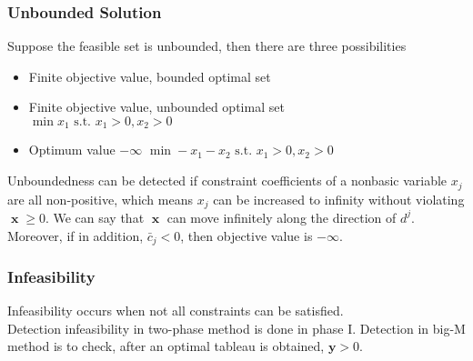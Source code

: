 \documentclass[12pt]{article}
\theoremstyle{definition}
\DeclareMathOperator{\x}{\mathbf{x}}
\begin{document}
\subsubsection{Unbounded Solution}
Suppose the feasible set is unbounded, then there are three possibilities
\begin{itemize}
  \item Finite objective value, bounded optimal set
  \item Finite objective value, unbounded optimal set\\
  $\min x_1 \text{ s.t. }x_1>0, x_2>0$
  \item Optimum value $-\infty$
  $\min -x_1-x_2\text{ s.t. }x_1>0, x_2>0$
\end{itemize}
Unboundedness can be detected if constraint coefficients of a nonbasic variable $x_j$ are all non-positive, which means $x_j$ can be increased to infinity without violating $\x\geq 0$. We can say that $\x$ can move infinitely along the direction of $d^j$.\\
Moreover, if in addition, $\bar{c}_j<0$, then objective value is $-\infty$.
\subsubsection{Infeasibility}
Infeasibility occurs when not all constraints can be satisfied.\\
Detection infeasibility in two-phase method is done in phase I. Detection in big-M method is to check, after an optimal tableau is obtained, $\mathbf{y}>0$.
\clearpage 
\end{document}
